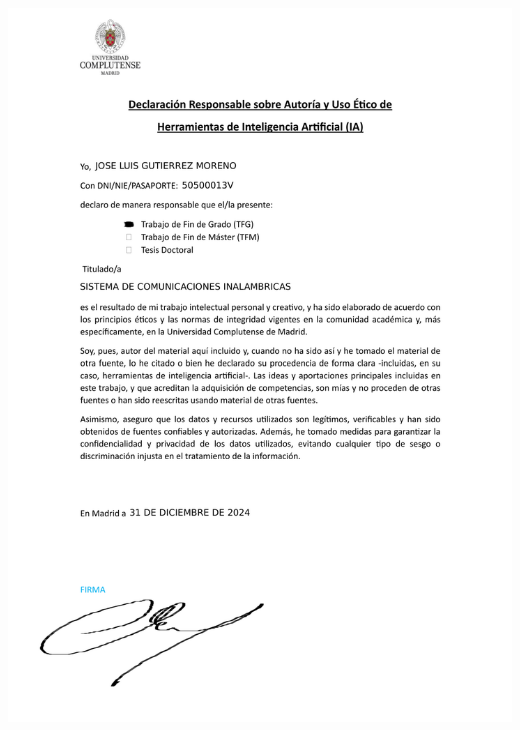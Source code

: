 \documentclass[11pt, a4paper]{article} %
\begin{document}
%
\newpage

% 
% 
% 

\includegraphics[width=1\textwidth]{./normas-documentacion/iadeclaracion.pdf}
\newpage
\end{document}
